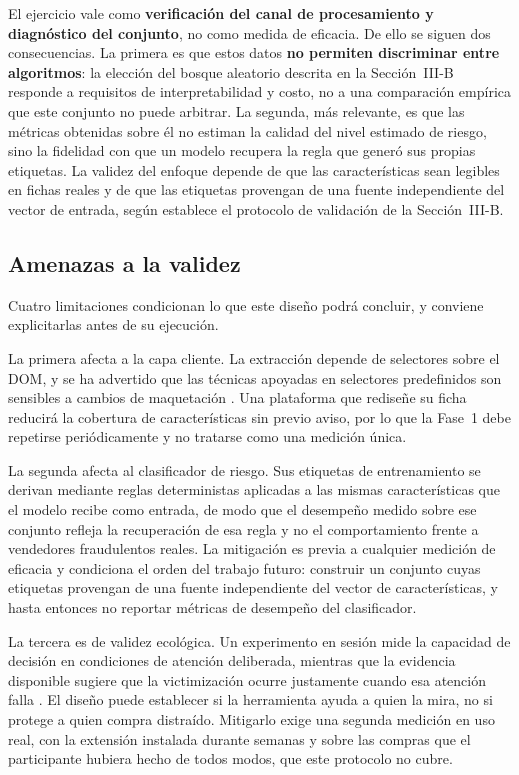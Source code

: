 El ejercicio vale como \textbf{verificación del canal de procesamiento y diagnóstico del
conjunto}, no como medida de eficacia. De ello se siguen dos consecuencias. La primera es que
estos datos \textbf{no permiten discriminar entre algoritmos}: la elección del bosque
aleatorio descrita en la Sección~III-B responde a requisitos de interpretabilidad y costo, no a
una comparación empírica que este conjunto no puede arbitrar. La segunda, más relevante, es
que las métricas obtenidas sobre él no estiman la calidad del nivel estimado de riesgo, sino
la fidelidad con que un modelo recupera la regla que generó sus propias etiquetas. La validez
del enfoque depende de que las características sean legibles en fichas reales y de que las
etiquetas provengan de una fuente independiente del vector de entrada, según establece el
protocolo de validación de la Sección~III-B.

\subsection{Amenazas a la validez}

Cuatro limitaciones condicionan lo que este diseño podrá concluir, y conviene explicitarlas
antes de su ejecución.

La primera afecta a la capa cliente. La extracción depende de selectores sobre el DOM, y se
ha advertido que las técnicas apoyadas en selectores predefinidos son sensibles a cambios de
maquetación \cite{ref24}. Una plataforma que rediseñe su ficha reducirá la cobertura de
características sin previo aviso, por lo que la Fase~1 debe repetirse periódicamente y no
tratarse como una medición única.

La segunda afecta al clasificador de riesgo. Sus etiquetas de entrenamiento se derivan
mediante reglas deterministas aplicadas a las mismas características que el modelo recibe como
entrada, de modo que el desempeño medido sobre ese conjunto refleja la recuperación de esa
regla y no el comportamiento frente a vendedores fraudulentos reales. La mitigación es previa
a cualquier medición de eficacia y condiciona el orden del trabajo futuro: construir un
conjunto cuyas etiquetas provengan de una fuente independiente del vector de características,
y hasta entonces no reportar métricas de desempeño del clasificador.

La tercera es de validez ecológica. Un experimento en sesión mide la capacidad de decisión en
condiciones de atención deliberada, mientras que la evidencia disponible sugiere que la
victimización ocurre justamente cuando esa atención falla \cite{ref27}. El diseño puede
establecer si la herramienta ayuda a quien la mira, no si protege a quien compra distraído.
Mitigarlo exige una segunda medición en uso real, con la extensión instalada durante semanas y
sobre las compras que el participante hubiera hecho de todos modos, que este protocolo no
cubre.

